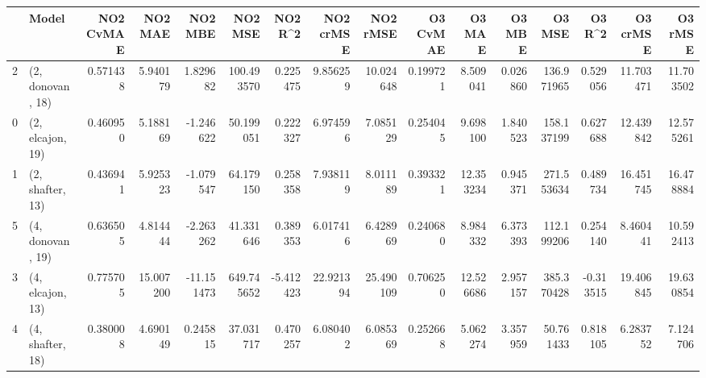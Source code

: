 \begin{tabular}{llrrrrrrrrrrrrrr}
\toprule
{} &             Model &  NO2 CvMAE &    NO2 MAE &    NO2 MBE &     NO2 MSE &   NO2 R\textasciicircum2 &  NO2 crMSE &   NO2 rMSE &  O3 CvMAE &     O3 MAE &    O3 MBE &      O3 MSE &    O3 R\textasciicircum2 &   O3 crMSE &    O3 rMSE \\
\midrule
2 &  (2, donovan, 18) &   0.571438 &   5.940179 &   1.829682 &  100.493570 &  0.225475 &   9.856259 &  10.024648 &  0.199721 &   8.509041 &  0.026860 &  136.971965 &  0.529056 &  11.703471 &  11.703502 \\
0 &  (2, elcajon, 19) &   0.460950 &   5.188169 &  -1.246622 &   50.199051 &  0.222327 &   6.974596 &   7.085129 &  0.254045 &   9.698100 &  1.840523 &  158.137199 &  0.627688 &  12.439842 &  12.575261 \\
1 &  (2, shafter, 13) &   0.436941 &   5.925323 &  -1.079547 &   64.179150 &  0.258358 &   7.938119 &   8.011189 &  0.393321 &  12.353234 &  0.945371 &  271.553634 &  0.489734 &  16.451745 &  16.478884 \\
5 &  (4, donovan, 19) &   0.636505 &   4.814444 &  -2.263262 &   41.331646 &  0.389353 &   6.017416 &   6.428969 &  0.240680 &   8.984332 &  6.373393 &  112.199206 &  0.254140 &   8.460441 &  10.592413 \\
3 &  (4, elcajon, 13) &   0.775705 &  15.007200 & -11.151473 &  649.745652 & -5.412423 &  22.921394 &  25.490109 &  0.706250 &  12.526686 &  2.957157 &  385.370428 & -0.313515 &  19.406845 &  19.630854 \\
4 &  (4, shafter, 18) &   0.380008 &   4.690149 &   0.245815 &   37.031717 &  0.470257 &   6.080402 &   6.085369 &  0.252668 &   5.062274 &  3.357959 &   50.761433 &  0.818105 &   6.283752 &   7.124706 \\
\bottomrule
\end{tabular}
